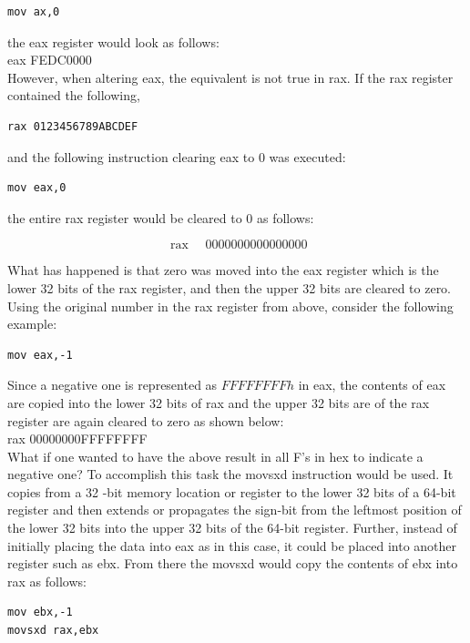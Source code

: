 \documentclass[10pt]{article}
\begin{document}
\begin{verbatim}
mov ax,0
\end{verbatim}

the eax register would look as follows:\\
eax FEDC0000\\
However, when altering eax, the equivalent is not true in rax. If the rax register contained the following,

\begin{verbatim}
rax 0123456789ABCDEF
\end{verbatim}

and the following instruction clearing eax to 0 was executed:

\begin{verbatim}
mov eax,0
\end{verbatim}

the entire rax register would be cleared to 0 as follows:

$$
\text { rax } \quad 0000000000000000
$$

What has happened is that zero was moved into the eax register which is the lower 32 bits of the rax register, and then the upper 32 bits are cleared to zero. Using the original number in the rax register from above, consider the following example:

\begin{verbatim}
mov eax,-1
\end{verbatim}

Since a negative one is represented as $F F F F F F F F h$ in eax, the contents of eax are copied into the lower 32 bits of rax and the upper 32 bits are of the rax register are again cleared to zero as shown below:\\
rax 00000000FFFFFFFF\\
What if one wanted to have the above result in all F's in hex to indicate a negative one? To accomplish this task the movsxd instruction would be used. It copies from a 32 -bit memory location or register to the lower 32 bits of a 64-bit register and then extends or propagates the sign-bit from the leftmost position of the lower 32 bits into the upper 32 bits of the 64-bit register. Further, instead of initially placing the data into eax as in this case, it could be placed into another register such as ebx. From there the movsxd would copy the contents of ebx into rax as follows:

\begin{verbatim}
mov ebx,-1
movsxd rax,ebx
\end{verbatim}
\end{document}
